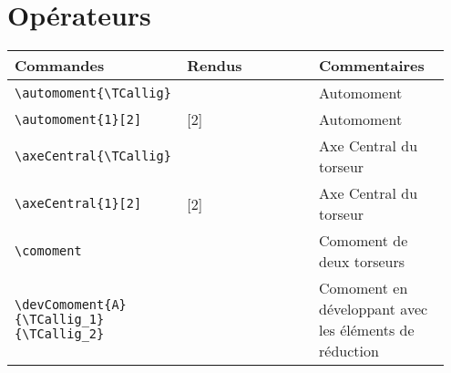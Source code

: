 \documentclass[a4paper,10pt]{article}
\begin{document}
	\section{Opérateurs}
	\noindent
	\begin{tabular}{|p{0.35\linewidth}|p{0.3\linewidth}|p{0.3\linewidth}|}
		\hline
			\textbf{Commandes}&\textbf{Rendus}&\textbf{Commentaires}
		\\\hline\hline
			\verb!\automoment{\TCallig}!		&	\automoment{\TCallig}	&	Automoment
		\\\hline
			\verb!\automoment{1}[2]!	&	\automoment{1}[2]	&	Automoment
		\\\hline
			\verb!\axeCentral{\TCallig}!	&	\axeCentral{\TCallig}	&	Axe Central du torseur
		\\\hline
			\verb!\axeCentral{1}[2]!	&	\axeCentral{1}[2]	&	Axe Central du torseur
		\\\hline
			\verb!\comoment! 	&	\comoment	&	Comoment de deux torseurs
		\\\hline
			\verb!\devComoment{A}! \verb!{\TCallig_1}! \verb!{\TCallig_2}!	&	\devComoment{A}{\TCallig_1}{\TCallig_2}	&	Comoment en développant avec les éléments de réduction
		\\\hline
	\end{tabular}
\end{document}
